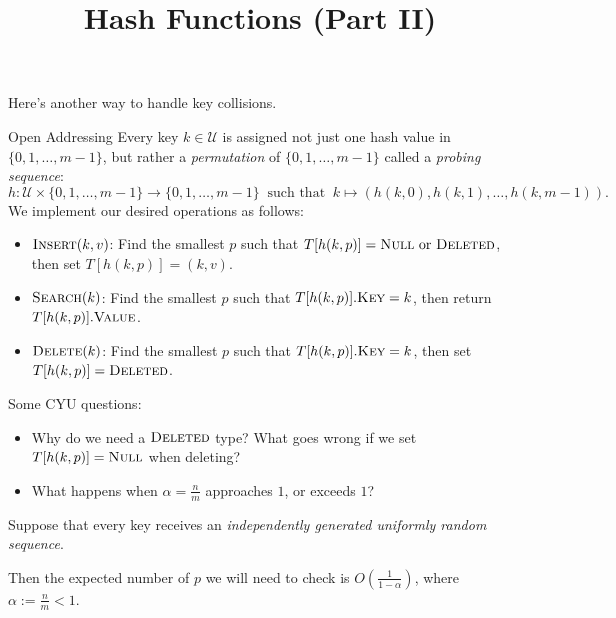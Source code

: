 \title{Hash Functions (Part II)}



Here's another way to handle key collisions.

\begin{solution}{Open Addressing}
    Every key $k \in \mathcal{U}$ is assigned not just one hash value in $\{0, 1, \dots, m - 1\}$, but rather a \emph{permutation} of $\{0, 1, \dots, m - 1\}$ called a \emph{probing sequence}:
    \[ h: \mathcal{U} \times \{0, 1, \dots, m - 1\} \to \{0, 1, \dots, m-  1\} ~ \text{ such that } ~ k \mapsto (h(k, 0), h(k, 1), \dots, h(k, m - 1)). \]
    We implement our desired operations as follows:
    \begin{itemize}
        \item $\textsc{Insert}(k, v)$: Find the smallest $p$ such that $T[h(k, p)] = \textsc{Null} \text{ or } \textsc{Deleted}$, then set $T[h(k, p)] = (k, v)$.
        \item $\textsc{Search}(k)$: Find the smallest $p$ such that $T[h(k, p)].\textsc{Key} = k$, then return $T[h(k, p)].\textsc{Value}$.
        \item $\textsc{Delete}(k)$: Find the smallest $p$ such that $T[h(k, p)].\textsc{Key} = k$, then set $T[h(k, p)] = \textsc{Deleted}$.
    \end{itemize}
\end{solution}

\begin{remark}
    Some CYU questions:
    \begin{itemize}
        \item Why do we need a $\textsc{Deleted}$ type?  What goes wrong if we set $T[h(k, p)] = \textsc{Null}$ when deleting?
        \item What happens when $\alpha = \frac{n}{m}$ approaches $1$, or exceeds $1$?
    \end{itemize}
\end{remark}

\begin{claim}
    Suppose that every key receives an \emph{independently generated uniformly random sequence}.
    
    Then the expected number of $p$ we will need to check is $O\left(\frac{1}{1 - \alpha}\right)$, where $\alpha := \frac{n}{m} < 1$.
\end{claim}

